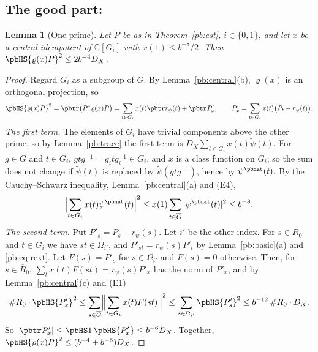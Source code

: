 \documentclass[10pt]{amsart}
\newtheorem{lemma}[theorem]{Lemma}
\theoremstyle{definition}
\theoremstyle{remark}
\newcommand{\C}{\mathbb C}
\providecommand{\auDX}{D_X}
\providecommand{\auG}{\overline G}
\providecommand{\pbR}{\overline R_0}
\providecommand{\pbrpsi}{r_\psi}
\begin{document}
\subsection{The good part: \texorpdfstring{{\cite[Proposition~14.32(ii)]{P46}}}{[Row D, Proposition~14.32(ii)]}}\label{pb:ss-ii}

\begin{lemma}[One prime]\label{pb:oneprime}
Let $P$ be as in Theorem~\ref{pb:est}, $i\in\{0,1\}$, and let $x$ be a central idempotent of
$\C[G_i]$ with $x(1)\le b^{-8}/2$. Then $\pbHS{\varrho(x)P}^2\le2b^{-4}\auDX$.
\end{lemma}
\begin{proof}
Regard $G_i$ as a subgroup of $\auG$. By Lemma~\ref{pb:central}(b), $\varrho(x)$ is an orthogonal
projection, so
\[
\pbHS{\varrho(x)P}^2=\pbtr\bigl(P^*\varrho(x)P\bigr)=\sum_{t\in G_i}x(t)\pbtr\pbrpsi(t)+\pbtr P'_x,
\qquad P'_x=\sum_{t\in G_i}x(t)\bigl(P_t-\pbrpsi(t)\bigr).
\]
\emph{The first term.} The elements of $G_i$ have trivial components above the other prime, so by
Lemma~\ref{pb:trace} the first term is $\auDX\sum_{t\in G_i}x(t)\tilde\psi(t)$. For
$g\in\auG$ and $t\in G_i$, $gtg^{-1}=g_itg_i^{-1}\in G_i$, and $x$ is a class function on $G_i$; so
the sum does not change if $\tilde\psi(t)$ is replaced by $\tilde\psi(gtg^{-1})$, hence by
$\psi^{\pbnat}(t)$. By the Cauchy--Schwarz inequality, Lemma~\ref{pb:central}(a) and (E4),
\[
\Bigl|\sum_{t\in G_i}x(t)\psi^{\pbnat}(t)\Bigr|^2\le x(1)\sum_{t\in\auG}|\psi^{\pbnat}(t)|^2
\le b^{-8} .
\]
\emph{The second term.} Put $P'_s=P_s-\pbrpsi(s)$. Let $i'$ be the other index. For $s\in\pbR$ and
$t\in G_i$ we have $st\in\Omega_{i'}$, and $P'_{st}=\pbrpsi(s)P'_t$ by Lemma~\ref{pb:basic}(a) and
\eqref{pb:eq-rext}. Let $F(s)=P'_s$ for $s\in\Omega_{i'}$ and $F(s)=0$ otherwise. Then, for
$s\in\pbR$, $\sum_tx(t)F(st)=\pbrpsi(s)P'_x$ has the norm of $P'_x$, and by
Lemma~\ref{pb:central}(c) and (E1)
\[
\#\pbR\cdot\pbHS{P'_x}^2\le\sum_{s\in\auG}\Bigl\|\sum_{t\in G_i}x(t)F(st)\Bigr\|^2\le\sum_{s\in
\Omega_{i'}}\pbHS{P'_s}^2\le b^{-12}\,\#\pbR\cdot\auDX .
\]
So $|\pbtr P'_x|\le\pbHS1\,\pbHS{P'_x}\le b^{-6}\auDX$. Together, $\pbHS{\varrho(x)P}^2\le(b^{-4}+
b^{-6})\auDX$.
\end{proof}
\end{document}
